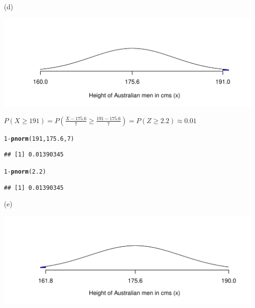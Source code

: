 \documentclass[bigtut]{tutorial}\usepackage[]{graphicx}\usepackage[]{color}
\makeatletter
\def\maxwidth{ %
  \ifdim\Gin@nat@width>\linewidth
    \linewidth
  \else
    \Gin@nat@width
  \fi
}
\newcommand{\hlnum}[1]{\textcolor[rgb]{0.686,0.059,0.569}{#1}}%
\newcommand{\hlopt}[1]{\textcolor[rgb]{0,0,0}{#1}}%
\newcommand{\hlstd}[1]{\textcolor[rgb]{0.345,0.345,0.345}{#1}}%
\newcommand{\hlkwd}[1]{\textcolor[rgb]{0.737,0.353,0.396}{\textbf{#1}}}%
\newenvironment{kframe}{%
 \def\at@end@of@kframe{}%
 \ifinner\ifhmode%
  \def\at@end@of@kframe{\end{minipage}}%
  \begin{minipage}{\columnwidth}%
 \fi\fi%
 \def\FrameCommand##1{\hskip\@totalleftmargin \hskip-\fboxsep
 \colorbox{shadecolor}{##1}\hskip-\fboxsep
     \hskip-\linewidth \hskip-\@totalleftmargin \hskip\columnwidth}%
 \MakeFramed {\advance\hsize-\width
   \@totalleftmargin\z@ \linewidth\hsize
   \@setminipage}}%
 {\par\unskip\endMakeFramed%
 \at@end@of@kframe}
\newenvironment{knitrout}{}{} %
\makeatother
\begin{document}
\begin{tutorial}
\begin{questions}
\begin{solution}
(d)

\begin{knitrout}
\color{fgcolor}
\includegraphics[width=\maxwidth]{figure/unnamed-chunk-5-1} 

\end{knitrout}


$P(X \geq 191) = P(\frac{X-175.6}{7} \geq \frac{191-175.6}{7}) = P(Z \geq 2.2) \approx 0.01$

\begin{knitrout}
\color{fgcolor}\begin{kframe}
\begin{alltt}
\hlnum{1}\hlopt{-}\hlkwd{pnorm}\hlstd{(}\hlnum{191}\hlstd{,}\hlnum{175.6}\hlstd{,}\hlnum{7}\hlstd{)}
\end{alltt}
\begin{verbatim}
## [1] 0.01390345
\end{verbatim}
\begin{alltt}
\hlnum{1}\hlopt{-}\hlkwd{pnorm}\hlstd{(}\hlnum{2.2}\hlstd{)}
\end{alltt}
\begin{verbatim}
## [1] 0.01390345
\end{verbatim}
\end{kframe}
\end{knitrout}

(e)

\begin{knitrout}
\color{fgcolor}
\includegraphics[width=\maxwidth]{figure/unnamed-chunk-7-1} 


\end{knitrout}
\end{solution}
\end{questions}
\end{tutorial}
\end{document}
